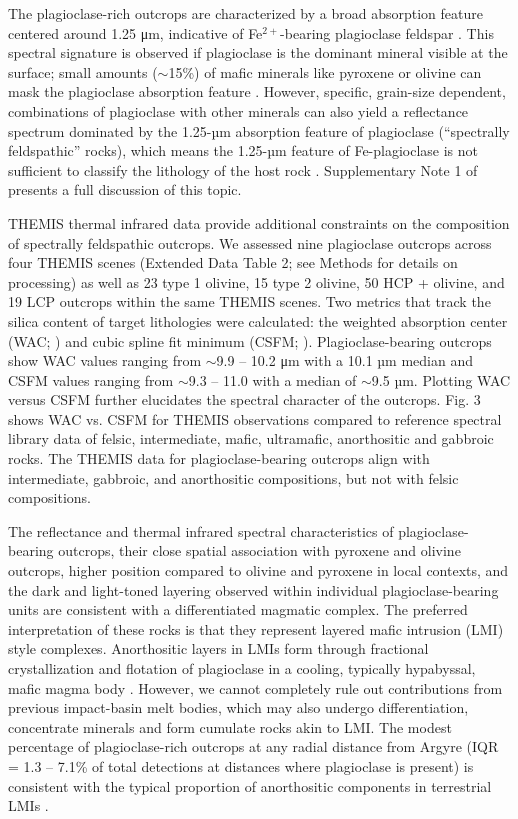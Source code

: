 \documentclass[11pt]{article}
\begin{document}
The plagioclase-rich outcrops are characterized by a broad absorption feature centered around 1.25 μm, indicative of Fe$^{2+}$-bearing plagioclase feldspar \citep{Adams1967, Adams1973, Adams1978}. This spectral signature is observed if plagioclase is the dominant mineral visible at the surface; small amounts ($\sim$15\%) of mafic minerals like pyroxene or olivine can mask the plagioclase absorption feature \citep{Crown1987, Pompilio2007, Serventi2013, Serventi2015, Cheek2014}. However, specific, grain-size dependent, combinations of plagioclase with other minerals can also yield a reflectance spectrum dominated by the 1.25-µm absorption feature of plagioclase (``spectrally feldspathic'' rocks), which means the 1.25-µm feature of Fe-plagioclase is not sufficient to classify the lithology of the host rock \citep{Rogers2015, Barthez2023, Vannier2024}. Supplementary Note 1 of \citet{Phillips2022} presents a full discussion of this topic.

THEMIS thermal infrared data provide additional constraints on the composition of spectrally feldspathic outcrops. We assessed nine plagioclase outcrops across four THEMIS scenes (Extended Data Table 2; see Methods for details on processing) as well as 23 type 1 olivine, 15 type 2 olivine, 50 HCP + olivine, and 19 LCP outcrops within the same THEMIS scenes. Two metrics that track the silica content of target lithologies were calculated: the weighted absorption center (WAC; \citealt{Smith2013, Amador2016}) and cubic spline fit minimum (CSFM; \citealt{Rogers2015}). Plagioclase-bearing outcrops show WAC values ranging from $\sim$9.9 -- 10.2 μm with a 10.1 µm median and CSFM values ranging from $\sim$9.3 -- 11.0 with a median of $\sim$9.5 µm. Plotting WAC versus CSFM further elucidates the spectral character of the outcrops. Fig. 3 shows WAC vs. CSFM for THEMIS observations compared to reference spectral library data of felsic, intermediate, mafic, ultramafic, anorthositic and gabbroic rocks. The THEMIS data for plagioclase-bearing outcrops align with intermediate, gabbroic, and anorthositic compositions, but not with felsic compositions.

The reflectance and thermal infrared spectral characteristics of plagioclase-bearing outcrops, their close spatial association with pyroxene and olivine outcrops, higher position compared to olivine and pyroxene in local contexts, and the dark and light-toned layering observed within individual plagioclase-bearing units are consistent with a differentiated magmatic complex. The preferred interpretation of these rocks is that they represent layered mafic intrusion (LMI) style complexes. Anorthositic layers in LMIs form through fractional crystallization and flotation of plagioclase in a cooling, typically hypabyssal, mafic magma body \citep{Ashwal1993}. However, we cannot completely rule out contributions from previous impact-basin melt bodies, which may also undergo differentiation, concentrate minerals and form cumulate rocks akin to LMI. The modest percentage of plagioclase-rich outcrops at any radial distance from Argyre (IQR = 1.3 -- 7.1\% of total detections at distances where plagioclase is present) is consistent with the typical proportion of anorthositic components in terrestrial LMIs \citep{Ashwal1993, Ashwal2021}.
\end{document}
